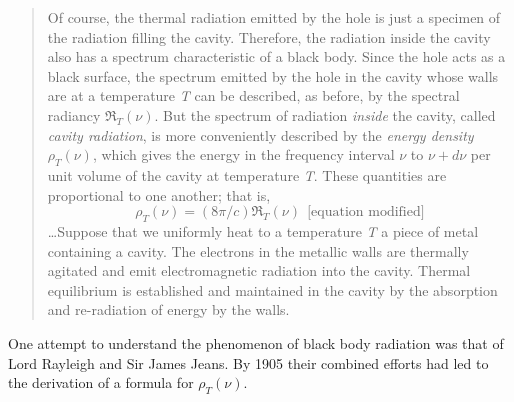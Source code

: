 \begin{quotation}
Of course, the thermal radiation emitted by the hole is just a specimen
of the radiation filling the cavity. Therefore, the radiation inside the
cavity also has a spectrum characteristic of a black body. Since the
hole acts as a black surface, the spectrum emitted by the hole in the
cavity whose walls are at a temperature \emph{T} can be described, as
before, by the spectral radiancy $\Re_T(\nu)$. But the
spectrum of radiation \emph{inside} the cavity, called \emph{cavity
radiation}, is more conveniently described by the \emph{energy density}
$\rho_T(\nu)$, which gives the energy in the frequency
interval $\nu$ to $\nu\! +\! d\nu$ per unit volume of the cavity
at temperature \emph{T}. These quantities are proportional to one
another; that is,
%
\setcounter{equation}{3}
\begin{equation}
\rho_T(\nu) = (8\pi/c) \Re_T(\nu)\ \ \text{[equation modified]}
\end{equation}
%
\ldots Suppose that we uniformly heat to a temperature \emph{T} a piece
of metal containing a cavity. The electrons in the metallic walls are
thermally agitated and emit electromagnetic radiation into the cavity.
Thermal equilibrium is established and maintained in the cavity by the
absorption and re-radiation of energy by the walls.
\end{quotation}

One attempt to understand the phenomenon of black body radiation was
that of Lord Rayleigh and Sir James Jeans. By 1905 their combined
efforts had led to the derivation of a formula for
$\rho_T(\nu)$.

